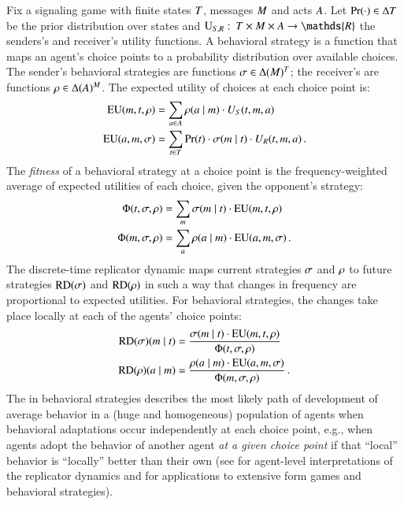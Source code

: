 \documentclass[fleqn,reqno,10pt]{article}
\newcommand{\rd}{\acro{rd}} %
\newcommand{\RD}{\ensuremath{\mathrm{RD}}} %
\begin{document}
Fix a signaling game with finite states $T$, messages $M$
and acts $A$. Let $\Pr(\cdot) \in \Delta{\ensuremath{T}}$ be the prior
distribution over states and $\Util_{\sen,\rec} \mycolon \States
\times \Messgs \times \Acts \rightarrow \mathds{R}$ the senders's and
receiver's utility functions. A behavioral strategy is a function that
maps an agent's choice points to a probability distribution over
available choices. The sender's behavioral strategies are functions
$\sigma \in \Delta(M)^T$; the receiver's are functions
$\rho \in \Delta(A)^M$. The expected utility of choices
at each choice point is:
\begin{align*}
  \mathrm{EU}(m, t, \rho) & = \sum_{a \in A}
  \rho(a \mid m) \cdot U_S(t, m, a) \\
  \mathrm{EU}(a, m, \sigma) & = \sum_{t \in
    T} \Pr(t) \cdot \sigma(m \mid t) \cdot
  U_R(t, m, a) \,.
\end{align*}
The \emph{fitness} of a behavioral strategy at a choice point is the
frequency-weighted average of expected utilities of each choice, given
the opponent's strategy:
\begin{align*}
  \Phi(t,\sigma, \rho) & = \sum_{m} \sigma(m \mid t) \cdot
\mathrm{EU}(m, t,\rho) \\
\Phi(m,\sigma, \rho) & = \sum_{a} \rho(a \mid m)
\cdot \mathrm{EU}(a, m,\sigma)\,.
\end{align*}
The discrete-time replicator dynamic maps current strategies $\sigma$
and $\rho$ to future strategies $\RD(\Sstrat)$ and $\RD(\Rstrat)$
in such a way that changes in frequency are proportional to expected
utilities. For behavioral strategies, the changes take place locally
at each of the agents' choice points:
\begin{align*}
  \RD(\Sstrat)(\messg \probbar \state) & = \frac{\Sstrat(\messg \probbar \state) \cdot
    \EU(\messg, \state,\Rstrat)} {\Phi(\state,\Sstrat, \Rstrat)} \\
    \RD(\Rstrat)(\act \probbar \messg) & = \frac{\Rstrat(\act \probbar \messg) \cdot
    \EU(\act, \messg,\Sstrat)} {\Phi(\messg,\Sstrat, \Rstrat)}  \,.
\end{align*}
The \rd in behavioral strategies describes the most likely path of
development of average behavior in a (huge and homogeneous) population
of agents when behavioral adaptations occur independently at each
choice point, e.g., when agents adopt the behavior of another agent
\emph{at a given choice point} if that ``local'' behavior is
``locally'' better than their own (see
\citeauthor{Sandholm2013:Population-Game}
\citeyear{Sandholm2013:Population-Game} for agent-level
interpretations of the replicator dynamics and
\citeauthor{Cressman2003:Evolutionary-Dy}
\citeyear{Cressman2003:Evolutionary-Dy} for applications to extensive
form games and behavioral strategies).
\end{document}
